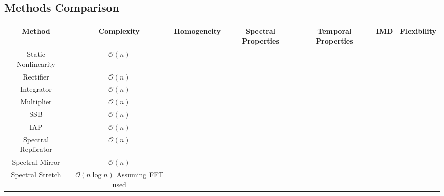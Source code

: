 \begin{landscape}
\section{Methods Comparison}
\label{sec:Excitation-Comparison}

	\begin{tabular}{|c|c|c|c|c|c|c|}
		\hline
		\bf{Method} & \bf{Complexity} & \bf{Homogeneity} & \bf{Spectral Properties} & \bf{Temporal Properties} &
		\bf{IMD} & \bf{Flexibility} \\ %
		\hline
		Static Nonlinearity & $\mathcal{O}(n)$ & & & & & \\
		\hline
		Rectifier & $\mathcal{O}(n)$ & & & & & \\
		\hline
		Integrator & $\mathcal{O}(n)$ & & & & & \\
		\hline
		Multiplier & $\mathcal{O}(n)$ & & & & & \\
		\hline
		SSB & $\mathcal{O}(n)$ & & & & & \\
		\hline
		IAP & $\mathcal{O}(n)$ & & & & & \\
		\hline
		Spectral Replicator & $\mathcal{O}(n)$ & & & & & \\
		\hline
		Spectral Mirror & $\mathcal{O}(n)$ & & & & & \\
		\hline
		Spectral Stretch & $\mathcal{O}(n\log{n})$ Assuming FFT used & & & & & \\
		\hline
	\end{tabular}

\end{landscape}

